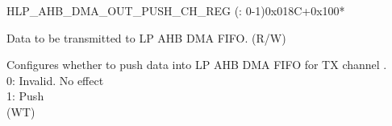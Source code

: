 \begin{register}{H}{LP\_AHB\_DMA\_OUT\_PUSH\_CH\_REG (: 0-1)}{0x018C+0x100*}\label{regdesc:LPAHBDMAOUTPUSHCHNREG}
%
%
%
\regnewline%
\begin{regdesc}\begin{reglist}
\label{fielddesc:LPAHBDMAOUTFIFOWDATACHN}\item [LP\_AHB\_DMA\_OUTFIFO\_WDATA\_CH\regindex{n}] Data to be transmitted to LP AHB DMA FIFO. (R/W)
\label{fielddesc:LPAHBDMAOUTFIFOPUSHCHN}\item [LP\_AHB\_DMA\_OUTFIFO\_PUSH\_CH\regindex{n}] Configures whether to push data into LP AHB DMA FIFO for TX channel .\\0: Invalid. No effect\\1: Push\\ (WT)
\end{reglist}\end{regdesc}
\end{register}


